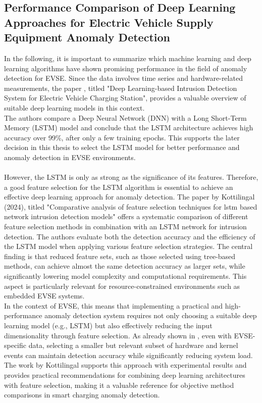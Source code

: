 \subsection{Performance Comparison of Deep Learning Approaches for Electric Vehicle Supply Equipment Anomaly Detection}

In the following, it is important to summarize which machine learning and deep learning algorithms have shown promising performance in the field of anomaly detection for EVSE. Since the data involves time series and hardware-related measurements, the paper \cite{deeplearing_compare_EVSE}, titled "Deep Learning-based Intrusion Detection System for Electric Vehicle Charging Station", provides a valuable overview of suitable deep learning models in this context.\\
The authors compare a Deep Neural Network (DNN) with a Long Short-Term Memory (LSTM) model and conclude that the LSTM architecture achieves high accuracy over 99\%, after only a few training epochs. This supports the later decision in this thesis to select the LSTM model for better performance and anomaly detection in EVSE environments.\\
\\
However, the LSTM is only as strong as the significance of its features. Therefore, a good feature selection for the LSTM algorithm is essential to achieve an effective deep learning approach for anomaly detection. The paper by Kottilingal (2024), titled "Comparative analysis of feature selection techniques for lstm based network intrusion detection models" \cite{feature_selection} offers a systematic comparison of different feature selection methods in combination with an LSTM network for intrusion detection. The authors evaluate both the detection accuracy and the efficiency of the LSTM model when applying various feature selection strategies. The central finding is that reduced feature sets, such as those selected using tree-based methods, can achieve almost the same detection accuracy as larger sets, while significantly lowering model complexity and computational requirements. This aspect is particularly relevant for resource-constrained environments such as embedded EVSE systems.\\
In the context of EVSE, this means that implementing a practical and high-performance anomaly detection system requires not only choosing a suitable deep learning model (e.g., LSTM) but also effectively reducing the input dimensionality through feature selection. As already shown in \cite{EV_Security}, even with EVSE-specific data, selecting a smaller but relevant subset of hardware and kernel events can maintain detection accuracy while significantly reducing system load. The work by Kottilingal supports this approach with experimental results and provides practical recommendations for combining deep learning architectures with feature selection, making it a valuable reference for objective method comparisons in smart charging anomaly detection.